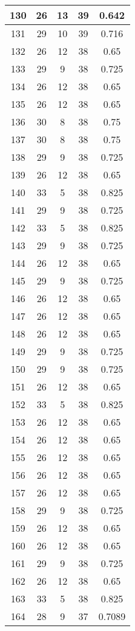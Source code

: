 \documentclass[letterpaper, 12pt]{article}
\begin{document}
\begin{longtable}{|c|c|c|c|c|}
\hline
130 & 26 & 13 & 39 & 0.642 \\
\hline
131 & 29 & 10 & 39 & 0.716 \\
\hline
132 & 26 & 12 & 38 & 0.65 \\
\hline
133 & 29 & 9 & 38 & 0.725 \\
\hline
134 & 26 & 12 & 38 & 0.65 \\
\hline
135 & 26 & 12 & 38 & 0.65 \\
\hline
136 & 30 & 8 & 38 & 0.75 \\
\hline
137 & 30 & 8 & 38 & 0.75 \\
\hline
138 & 29 & 9 & 38 & 0.725 \\
\hline
139 & 26 & 12 & 38 & 0.65 \\
\hline
140 & 33 & 5 & 38 & 0.825 \\
\hline
141 & 29 & 9 & 38 & 0.725 \\
\hline
142 & 33 & 5 & 38 & 0.825 \\
\hline
143 & 29 & 9 & 38 & 0.725 \\
\hline
144 & 26 & 12 & 38 & 0.65 \\
\hline
145 & 29 & 9 & 38 & 0.725 \\
\hline
146 & 26 & 12 & 38 & 0.65 \\
\hline
147 & 26 & 12 & 38 & 0.65 \\
\hline
148 & 26 & 12 & 38 & 0.65 \\
\hline
149 & 29 & 9 & 38 & 0.725 \\
\hline
150 & 29 & 9 & 38 & 0.725 \\
\hline
151 & 26 & 12 & 38 & 0.65 \\
\hline
152 & 33 & 5 & 38 & 0.825 \\
\hline
153 & 26 & 12 & 38 & 0.65 \\
\hline
154 & 26 & 12 & 38 & 0.65 \\
\hline
155 & 26 & 12 & 38 & 0.65 \\
\hline
156 & 26 & 12 & 38 & 0.65 \\
\hline
157 & 26 & 12 & 38 & 0.65 \\
\hline
158 & 29 & 9 & 38 & 0.725 \\
\hline
159 & 26 & 12 & 38 & 0.65 \\
\hline
160 & 26 & 12 & 38 & 0.65 \\
\hline
161 & 29 & 9 & 38 & 0.725 \\
\hline
162 & 26 & 12 & 38 & 0.65 \\
\hline
163 & 33 & 5 & 38 & 0.825 \\
\hline
164 & 28 & 9 & 37 & 0.7089 \\

\end{longtable}
\end{document}
